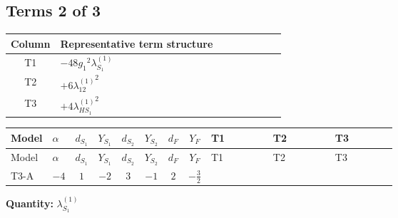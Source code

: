 \documentclass[8pt]{article}
\begin{document}
\begin{landscape}
\subsection*{Terms 2 of 3}
\begin{center}
\begin{tabular}{@{}c >{\raggedright\arraybackslash}p{0.82\linewidth}@{}}
\toprule
Column & Representative term structure \\
\midrule
T1 & \(\displaystyle -48 {g_1}^2 {\lambda_{S_1}^{(1)}}\) \\
\midrule
T2 & \(\displaystyle +6 {\lambda_{12}^{(1)}}^2\) \\
\midrule
T3 & \(\displaystyle +4 {\lambda_{HS_1}^{(1)}}^2\) \\
\midrule
\bottomrule
\end{tabular}
\end{center}
\smallskip
\tiny
\begin{longtable}{@{}llcccccc >{\raggedright\arraybackslash}p{0.21\linewidth} >{\raggedright\arraybackslash}p{0.21\linewidth} >{\raggedright\arraybackslash}p{0.21\linewidth}@{}}
\toprule
Model & $\alpha$ & $d_{S_1}$ & $Y_{S_1}$ & $d_{S_2}$ & $Y_{S_2}$ & $d_F$ & $Y_F$ & T1 & T2 & T3 \\
\midrule
\endfirsthead
\toprule
Model & $\alpha$ & $d_{S_1}$ & $Y_{S_1}$ & $d_{S_2}$ & $Y_{S_2}$ & $d_F$ & $Y_F$ & T1 & T2 & T3 \\
\midrule
\endhead
T3-A & $-4$ & $1$ & $-2$ & $3$ & $-1$ & $2$ & $-\frac{3}{2}$ & \scriptsize\adjustbox{max width=\linewidth}{$\begin{gathered} -48 {g_1}^2 {\lambda_{S_1}^{(1)}}\end{gathered}$} & \scriptsize\adjustbox{max width=\linewidth}{$\begin{gathered} +6 {\lambda_{12}^{(1)}}^2\end{gathered}$} & \scriptsize\adjustbox{max width=\linewidth}{$\begin{gathered} +4 {\lambda_{HS_1}^{(1)}}^2\end{gathered}$} \\
\midrule
\bottomrule
\end{longtable}
\clearpage
\noindent\textbf{Quantity: }$\lambda_{S_1}^{(1)}$\par\smallskip

\end{landscape}
\end{document}
